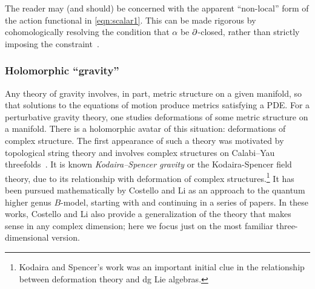 \documentclass[11pt]{amsart}
\begin{document}
The reader may (and should) be concerned with the apparent ``non-local'' form of the action functional in \eqref{eqn:scalar1}.
This can be made rigorous by cohomologically resolving the condition that $\alpha$ be $\partial$-closed, rather than strictly imposing the constraint~\cite{CLbcov}.

\subsubsection{Holomorphic ``gravity''}

Any theory of gravity involves, in part, metric structure on a given manifold,
so that solutions to the equations of motion produce metrics satisfying a PDE. 
For a perturbative gravity theory,
one studies deformations of some metric structure on a manifold.
There is a holomorphic avatar of this situation: deformations of complex structure. 
The first appearance of such a theory was motivated by topological string theory and involves complex structures on Calabi--Yau threefolds~\cite{BCOV}.
It is known \textit{Kodaira--Spencer gravity} or the Kodaira-Spencer field theory,
due to its relationship with deformation of complex structures.\footnote{Kodaira and Spencer's work was an important initial clue in the relationship between deformation theory and dg Lie algebras.}
It has been pursued mathematically by Costello and Li as an approach to the quantum higher genus $B$-model, starting with \cite{CLbcov} and continuing in a series of papers.
In these works, Costello and Li also provide a generalization of the theory that makes sense in any complex dimension; 
here we focus just on the most familiar three-dimensional version.
\end{document}
